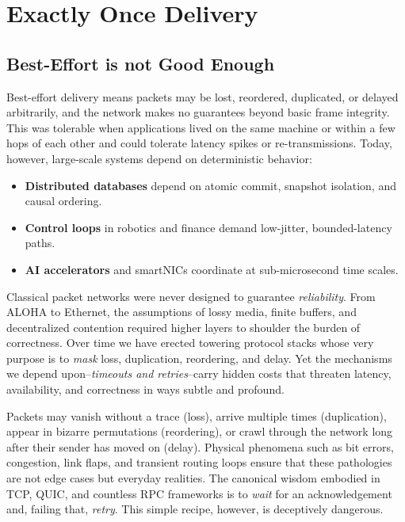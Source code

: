 \documentclass[../../../OAE-SPEC-MAIN.tex]{subfiles}
\begin{document}
\section{Exactly Once Delivery}

\subsection*{Best-Effort is not Good Enough}

Best-effort delivery means packets may be lost, reordered, duplicated, or delayed arbitrarily, and the network makes no guarantees beyond basic frame integrity. This was tolerable when applications lived on the same machine or within a few hops of each other and could tolerate latency spikes or re-transmissions. Today, however, large-scale systems depend on deterministic behavior:
\begin{itemize}
	\item \textbf{Distributed databases} depend on atomic commit, snapshot isolation, and causal ordering.
	\item \textbf{Control loops} in robotics and finance demand low-jitter, bounded-latency paths.
	\item \textbf{AI accelerators} and smartNICs coordinate at sub-microsecond time scales.
\end{itemize}
\vspace{1em}

Classical packet networks were never designed to guarantee \emph{reliability}.  From ALOHA to Ethernet, the assumptions of lossy media, finite buffers, and decentralized contention required higher layers to shoulder the burden of correctness.  Over time we have erected towering protocol stacks whose very purpose is to \emph{mask} loss, duplication, reordering, and delay.  Yet the mechanisms we depend upon--\textit{timeouts and retries}--carry hidden costs that threaten latency, availability, and correctness in ways subtle and profound.

Packets may vanish without a trace (loss), arrive multiple times (duplication), appear in bizarre permutations (reordering), or crawl through the network long after their sender has moved on (delay).  Physical phenomena such as bit errors, congestion, link flaps, and transient routing loops ensure that these pathologies are not edge cases but everyday realities.  The canonical wisdom \textemdash embodied in TCP, QUIC, and countless RPC frameworks \textemdash is to \emph{wait} for an acknowledgement and, failing that, \emph{retry}.  This simple recipe, however, is deceptively dangerous.
\end{document}
